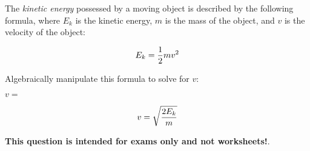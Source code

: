 

The {\it kinetic energy} possessed by a moving object is described by the following formula, where $E_k$ is the kinetic energy, $m$ is the mass of the object, and $v$ is the velocity of the object:

$$E_k = {1 \over 2} m v^2$$

Algebraically manipulate this formula to solve for $v$:

\vskip 20pt

$v = $







$$v = \sqrt{2 E_k \over m}$$







{\bf This question is intended for exams only and not worksheets!}.



